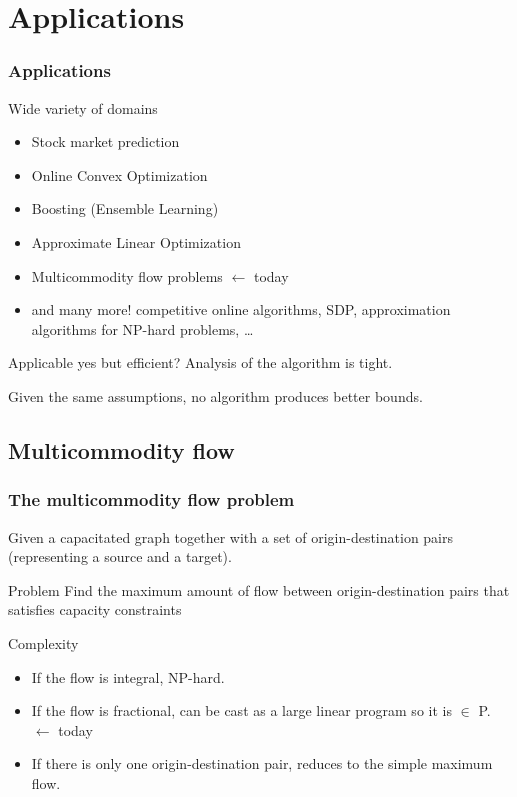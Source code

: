 \documentclass{beamer}
\begin{document}
\section{Applications}
\begin{frame}
    \frametitle{Applications}

    \begin{block}{Wide variety of domains}
        \begin{itemize}
            \item Stock market prediction
            \item Online Convex Optimization
            \item Boosting (Ensemble Learning)
            \item Approximate Linear Optimization
            \item Multicommodity flow problems $\leftarrow$ \alert{today}
            \item and many more! competitive online algorithms, SDP,
                approximation algorithms for NP-hard problems, \ldots
        \end{itemize}
    \end{block}

    \begin{block}{Applicable yes but efficient?}
        Analysis of the algorithm is tight.

        Given the same assumptions, no
        algorithm produces better bounds.
    \end{block}

\end{frame}

\subsection{Multicommodity flow}
\begin{frame}
    \frametitle{The multicommodity flow problem}

    Given a capacitated graph together with a set of origin-destination pairs
    (representing a source and a target).

    \begin{block}{Problem}
        Find the maximum amount of flow between origin-destination pairs that
        satisfies capacity constraints
    \end{block}

    \begin{block}{Complexity}
        \begin{itemize}
            \item If the flow is integral, NP-hard.
            \item If the flow is fractional, can be cast as a large linear
                program so it is $\in$ P. $\leftarrow$ \alert{today}
            \item If there is only one origin-destination pair, reduces to
                the simple maximum flow.
        \end{itemize}
    \end{block}
\end{frame}
\end{document}
